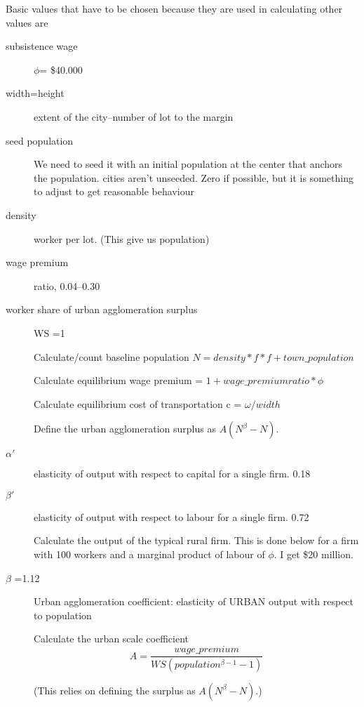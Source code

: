 Basic values that have to be chosen because they are used in calculating other values are
\begin{description}
\item  [subsistence wage] $\phi$=  \$40.000 %
\item  [width=height] extent of the city--number of lot to the margin 
\item [seed population] We need to seed it with an initial population at the center that anchors the population. cities aren't unseeded.  Zero if possible, but it is something to adjust to get reasonable behaviour
\item  [density ] worker per lot. (This give us population)
\item  [wage premium] ratio, 0.04--0.30 
\item [worker share of urban agglomeration surplus] 
WS =1 

Calculate/count baseline population 
$N=density * f * f  + town\_population$

Calculate  equilibrium wage premium = $1+wage\_premium ratio * \phi$

Calculate equilibrium cost of transportation c = $\omega/width$

Define the urban agglomeration surplus as $A(N^\beta-N)$.
 
\item  [$\alpha'$ ]  elasticity of output with respect to capital for a single firm. 0.18
\item  [$\beta'$ ]  elasticity of output with respect to labour for a single firm.  0.72

Calculate the output of the typical rural firm. This is done below for a firm with 100 workers and a marginal product of labour of $\phi$. I get \$20 million.

\item  [$\beta$ =1.12] Urban agglomeration coefficient: elasticity of URBAN output with respect to population 

Calculate the urban scale coefficient 
\[A = \frac{wage\_premium}{WS(population^{\beta-1}-1)}\]

(This relies on defining the surplus as $A(N^\beta-N)$.)

\end{description}


